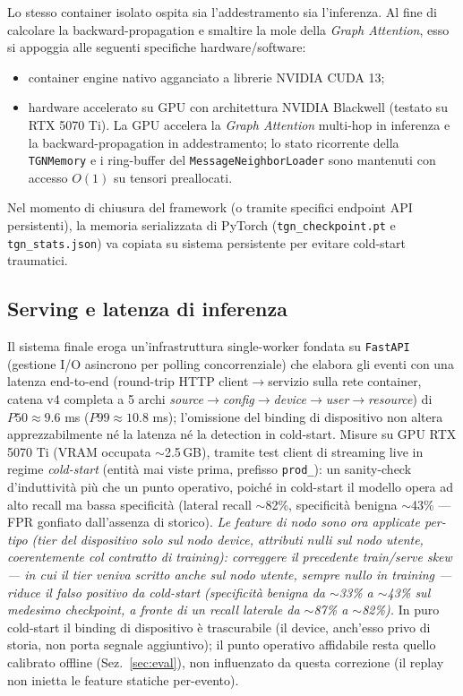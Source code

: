 \documentclass[11pt,a4paper]{report}
\begin{document}
Lo stesso container isolato ospita sia l'addestramento sia l'inferenza. Al fine di calcolare la backward-propagation e smaltire la mole della \textit{Graph Attention}, esso si appoggia alle seguenti specifiche hardware/software:

\begin{itemize}
    \item container engine nativo agganciato a librerie NVIDIA CUDA 13;
    \item hardware accelerato su GPU con architettura NVIDIA Blackwell (testato su RTX 5070 Ti). La GPU accelera la \textit{Graph Attention} multi-hop in inferenza e la backward-propagation in addestramento; lo stato ricorrente della \texttt{TGNMemory} e i ring-buffer del \texttt{MessageNeighborLoader} sono mantenuti con accesso $O(1)$ su tensori preallocati.
\end{itemize}

Nel momento di chiusura del framework (o tramite specifici endpoint API persistenti), la memoria serializzata di PyTorch (\texttt{tgn\_checkpoint.pt} e \texttt{tgn\_stats.json}) va copiata su sistema persistente per evitare cold-start traumatici.

\subsection{Serving e latenza di inferenza}

Il sistema finale eroga un'infrastruttura single-worker fondata su \texttt{FastAPI} (gestione I/O asincrono per polling concorrenziale) che elabora gli eventi con una latenza end-to-end (round-trip HTTP client$\to$servizio sulla rete container, catena v4 completa a 5 archi \textit{source}$\to$\textit{config}$\to$\textit{device}$\to$\textit{user}$\to$\textit{resource}) di $P50 \approx 9.6$ ms ($P99 \approx 10.8$ ms); l'omissione del binding di dispositivo non altera apprezzabilmente né la latenza né la detection in cold-start. Misure su GPU RTX 5070 Ti (VRAM occupata $\sim$2.5\,GB), tramite test client di streaming live in regime \textit{cold-start} (entità mai viste prima, prefisso \texttt{prod\_}): un sanity-check d'induttività più che un punto operativo, poiché in cold-start il modello opera ad alto recall ma bassa specificità (lateral recall $\sim$82\%, specificità benigna $\sim$43\% --- FPR gonfiato dall'assenza di storico). \emph{Le feature di nodo sono ora applicate per-tipo (tier del dispositivo solo sul nodo \textit{device}, attributi nulli sul nodo \textit{utente}, coerentemente col contratto di training): correggere il precedente \textit{train/serve skew} --- in cui il tier veniva scritto anche sul nodo utente, sempre nullo in training --- riduce il falso positivo da cold-start (specificità benigna da $\sim$33\% a $\sim$43\% sul medesimo checkpoint, a fronte di un recall laterale da $\sim$87\% a $\sim$82\%).} In puro cold-start il binding di dispositivo è trascurabile (il device, anch'esso privo di storia, non porta segnale aggiuntivo); il punto operativo affidabile resta quello calibrato offline (Sez.~\ref{sec:eval}), non influenzato da questa correzione (il replay non inietta le feature statiche per-evento).
\end{document}
